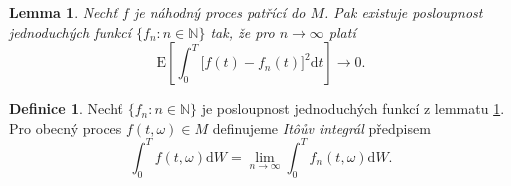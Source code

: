\documentclass[a4paper,12pt]{report}
\newtheorem{lemma}[veta]{Lemma}
\theoremstyle{definition} \newtheorem{definice}[veta]{Definice}
\theoremstyle{remark}
\begin{document}
\begin{lemma} \label{itoint}
Nechť $f$ je náhodný proces patřící do $M$.
Pak existuje posloupnost jednoduchých funkcí $\{f_n:n\in\mathbb N\}$ tak, že pro $n\to\infty$ platí
$$\mathrm{E}\left[\int_0^T\big[f(t)-f_n(t)\big]^2\mathrm{d}t\right]\longrightarrow0.$$
\end{lemma}

\indent

\begin{definice}
Nechť $\{f_n:n\in\mathbb N\}$ je posloupnost jednoduchých funkcí z lemmatu \ref{itoint}.
Pro obecný proces $f(t,\omega)\in M$ definujeme \textit{It\^oův integrál} předpisem
$$\int_0^Tf(t,\omega)\mathrm{d}W=\lim_{n\to\infty}\int_0^Tf_n(t,\omega)\mathrm{d}W.$$
\\
\end{definice}















\nocite{}  %

%


\end{document}
